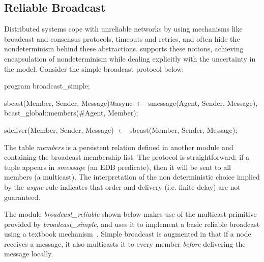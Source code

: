 \subsection{Reliable Broadcast}
Distributed systems cope with unreliable networks by using mechanisms like broadcast and consensus protocols, 
timeouts and retries, and often hide the nondeterminism behind these abstractions.  \lang supports these notions,
achieving encapsulation of nondeterminism while dealing explicitly with the uncertainty in the model.  Consider the simple
broadcast protocol below:


\begin{Dedalus}

program broadcast_simple;

sbcast(Member, Sender, Message)@async \(\leftarrow\)
    smessage(Agent, Sender, Message),
    bcast_global::members(#Agent, Member);

sdeliver(Member, Sender, Message) \(\leftarrow\)
    sbcast(Member, Sender, Message);

\end{Dedalus}

The table \emph{members} is a persistent relation defined in another module  and containing the broadcast 
membership list.  
The protocol is straightforward: if a tuple appears in \emph{smessage} (an EDB predicate), then
it will be sent to all members (a multicast).  The interpretation of the non deterministic choice implied by the
\emph{async} rule indicates that order and delivery (i.e. finite delay) are not guaranteed.

The module \emph{broadcast\_reliable} shown below makes use of the multicast primitive provided by \emph{broadcast\_simple}, and
uses it to implement a basic reliable broadcast using a textbook mechanism~\cite{mullender}. 
Simple broadcast is augmented in that if a node receives a message, it 
also multicasts it to every member \emph{before} delivering the message locally.  


